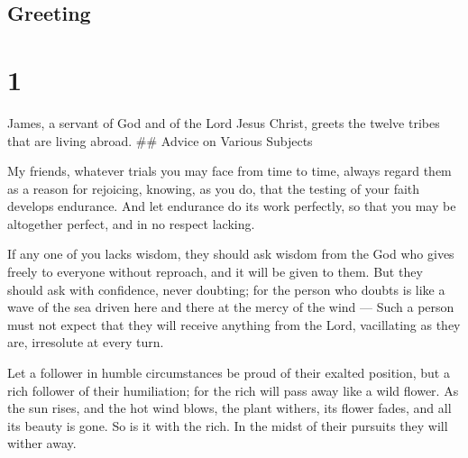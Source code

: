 \hypertarget{greeting}{%
\subsection{Greeting}\label{greeting}}

\hypertarget{section}{%
\section{1}\label{section}}

 James, a servant of God and of the Lord Jesus Christ,
greets the twelve tribes that are living abroad. \#\# Advice on Various
Subjects

 My friends, whatever trials you may face from time to time,
always regard them as a reason for rejoicing,  knowing, as
you do, that the testing of your faith develops endurance. 
And let endurance do its work perfectly, so that you may be altogether
perfect, and in no respect lacking.

 If any one of you lacks wisdom, they should ask wisdom from
the God who gives freely to everyone without reproach, and it will be
given to them.  But they should ask with confidence, never
doubting; for the person who doubts is like a wave of the sea driven
here and there at the mercy of the wind ---  Such a person
must not expect that they will receive anything from the Lord,
 vacillating as they are, irresolute at every turn.

 Let a follower in humble circumstances be proud of their
exalted position,  but a rich follower of their
humiliation; for the rich will pass away like a wild flower.
 As the sun rises, and the hot wind blows, the plant
withers, its flower fades, and all its beauty is gone. So is it with the
rich. In the midst of their pursuits they will wither away.

